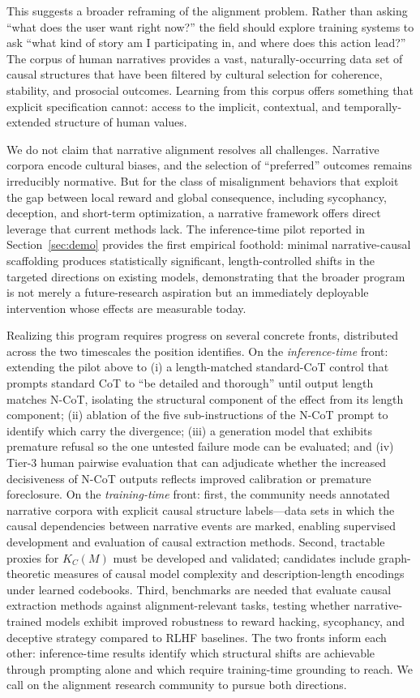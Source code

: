 \documentclass{article}
\theoremstyle{plain}
\theoremstyle{definition}
\theoremstyle{remark}
\begin{document}
This suggests a broader reframing of the alignment problem. Rather than asking ``what does the user want right now?'' the field should explore training systems to ask ``what kind of story am I participating in, and where does this action lead?'' The corpus of human narratives provides a vast, naturally-occurring data set of causal structures that have been filtered by cultural selection for coherence, stability, and prosocial outcomes. Learning from this corpus offers something that explicit specification cannot: access to the implicit, contextual, and temporally-extended structure of human values.

We do not claim that narrative alignment resolves all challenges. Narrative corpora encode cultural biases, and the selection of ``preferred'' outcomes remains irreducibly normative. But for the class of misalignment behaviors that exploit the gap between local reward and global consequence, including sycophancy, deception, and short-term optimization, a narrative framework offers direct leverage that current methods lack. The inference-time pilot reported in Section~\ref{sec:demo} provides the first empirical foothold: minimal narrative-causal scaffolding produces statistically significant, length-controlled shifts in the targeted directions on existing models, demonstrating that the broader program is not merely a future-research aspiration but an immediately deployable intervention whose effects are measurable today.

Realizing this program requires progress on several concrete fronts, distributed across the two timescales the position identifies. On the \emph{inference-time} front: extending the pilot above to (i) a length-matched standard-CoT control that prompts standard CoT to ``be detailed and thorough'' until output length matches N-CoT, isolating the structural component of the effect from its length component; (ii) ablation of the five sub-instructions of the N-CoT prompt to identify which carry the divergence; (iii) a generation model that exhibits premature refusal so the one untested failure mode can be evaluated; and (iv) Tier-3 human pairwise evaluation that can adjudicate whether the increased decisiveness of N-CoT outputs reflects improved calibration or premature foreclosure. On the \emph{training-time} front: first, the community needs annotated narrative corpora with explicit causal structure labels---data sets in which the causal dependencies between narrative events are marked, enabling supervised development and evaluation of causal extraction methods. Second, tractable proxies for $K_C(M)$ must be developed and validated; candidates include graph-theoretic measures of causal model complexity and description-length encodings under learned codebooks. Third, benchmarks are needed that evaluate causal extraction methods against alignment-relevant tasks, testing whether narrative-trained models exhibit improved robustness to reward hacking, sycophancy, and deceptive strategy compared to RLHF baselines. The two fronts inform each other: inference-time results identify which structural shifts are achievable through prompting alone and which require training-time grounding to reach. We call on the alignment research community to pursue both directions.




\newpage

\end{document}

